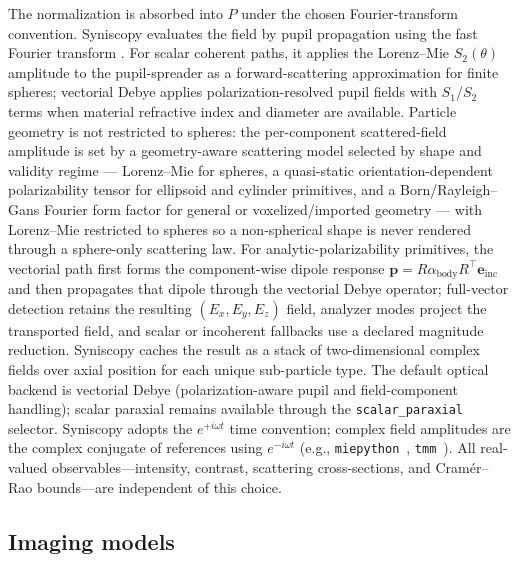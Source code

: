 The normalization is absorbed into $P$ under the chosen Fourier-transform convention. Syniscopy evaluates the field by pupil propagation using the fast Fourier transform \cite{fft-pupil}. For scalar coherent paths, it applies the Lorenz--Mie $S_2(\theta)$ amplitude to the pupil-spreader as a forward-scattering approximation for finite spheres; vectorial Debye applies polarization-resolved pupil fields with $S_1$/$S_2$ terms when material refractive index and diameter are available. Particle geometry is not restricted to spheres: the per-component scattered-field amplitude is set by a geometry-aware scattering model selected by shape and validity regime --- Lorenz--Mie for spheres, a quasi-static orientation-dependent polarizability tensor for ellipsoid and cylinder primitives, and a Born/Rayleigh--Gans Fourier form factor for general or voxelized/imported geometry --- with Lorenz--Mie restricted to spheres so a non-spherical shape is never rendered through a sphere-only scattering law. For analytic-polarizability primitives, the vectorial path first forms the component-wise dipole response $\mathbf{p}=R\alpha_{\mathrm{body}}R^\top\mathbf{e}_{\mathrm{inc}}$ and then propagates that dipole through the vectorial Debye operator; full-vector detection retains the resulting $(E_x,E_y,E_z)$ field, analyzer modes project the transported field, and scalar or incoherent fallbacks use a declared magnitude reduction. Syniscopy caches the result as a stack of two-dimensional complex fields over axial position for each unique sub-particle type. The default optical backend is vectorial Debye (polarization-aware pupil and field-component handling); scalar paraxial remains available through the \texttt{scalar\_paraxial} selector. Syniscopy adopts the $e^{+i\omega t}$ time convention; complex field amplitudes are the complex conjugate of references using $e^{-i\omega t}$ (e.g., \texttt{miepython}~\cite{miepython-software}, \texttt{tmm}~\cite{tmm-byrnes}). All real-valued observables---intensity, contrast, scattering cross-sections, and Cram\'er--Rao bounds---are independent of this choice.

\subsection{Imaging models}

